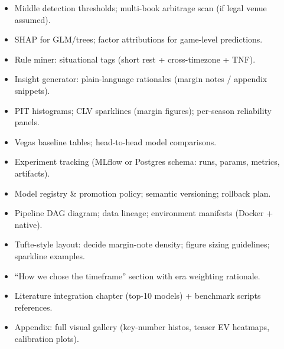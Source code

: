 \begin{itemize}
  \item {} Middle detection thresholds; multi-book arbitrage scan (if legal venue assumed).
\end{itemize}

\begin{itemize}
  \item {} SHAP for GLM/trees; factor attributions for game-level predictions.
  \item {} Rule miner: situational tags (short rest + cross-timezone + TNF).
  \item {} Insight generator: plain-language rationales (margin notes / appendix snippets).
\end{itemize}

\begin{itemize}
  \item {} PIT histograms; CLV sparklines (margin figures); per-season reliability panels.
  \item {} Vegas baseline tables; head-to-head model comparisons.
\end{itemize}

\begin{itemize}
  \item {} Experiment tracking (MLflow or Postgres schema: runs, params, metrics, artifacts).
  \item {} Model registry \& promotion policy; semantic versioning; rollback plan.
  \item {} Pipeline DAG diagram; data lineage; environment manifests (Docker + native).
\end{itemize}

\begin{itemize}
  \item {} Tufte-style layout: decide margin-note density; figure sizing guidelines; sparkline examples.
  \item {} “How we chose the timeframe” section with era weighting rationale.
  \item {} Literature integration chapter (top-10 models) + benchmark scripts references.
  \item {} Appendix: full visual gallery (key-number histos, teaser EV heatmaps, calibration plots).
\end{itemize}

